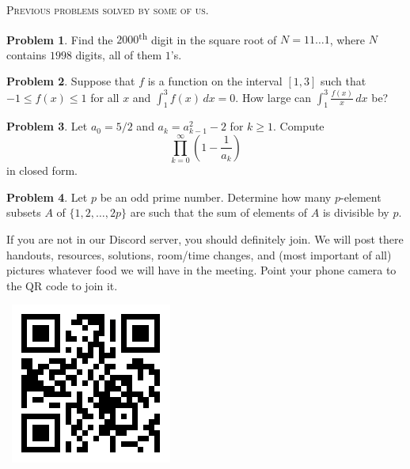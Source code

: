 \documentclass{scrartcl}
\theoremstyle{definition}
\newtheorem{prob}{Problem}
\begin{document}
	\newpage

	\begin{center}
		\textsc{Previous problems solved by some of us.}
	\end{center}

	\setcounter{prob}{2}
	\begin{prob}
		Find the $2000$\textsuperscript{th} digit in the square root of $N = 11\dots1$, where $N$ contains $1998$ digits, all of them $1$'s.
	\end{prob}

	\setcounter{prob}{13}
	\begin{prob}%
		Suppose that $f$ is a function on the interval $[1,3]$ such that $-1\le f(x)\le 1$ for all $x$ and $\displaystyle \int_1^3f(x)\,dx=0.$ How large can $\displaystyle\int_1^3\frac{f(x)}x\,dx$ be?
	\end{prob}

	\setcounter{prob}{14}
	\begin{prob}%
		Let $a_0=5/2$ and $a_k=a_{k-1}^2-2$ for $k\ge 1.$ Compute \[\prod_{k=0}^{\infty}\left(1-\frac1{a_k}\right)\] in closed form.
	\end{prob}

	\setcounter{prob}{16}
	\begin{prob}%
		Let $p$ be an odd prime number. Determine how many $p$-element subsets $A$ of $ \{1,2,\dots,2p\}$ are such that the sum of elements of \(A\) is divisible by $p$.
	\end{prob}


	\vfill

	\begin{minipage}{.85\textwidth}{}
		\footnotesize
		If you are not in our Discord server, you should definitely join.
		We will post there handouts, resources, solutions, room/time changes, and (most important of all) pictures whatever food we will have in the meeting. Point your phone camera to the QR code to join it.
	\end{minipage}
	\begin{minipage}{.15\textwidth}{}
		\ \hfill \includegraphics[height = .8in]{qr}
	\end{minipage}
\end{document}
